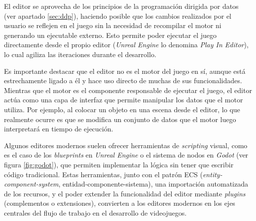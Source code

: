 \medskip

El editor se aprovecha de los principios de la programación dirigida por datos (ver apartado \ref{sec:ddp}), haciendo posible que los cambios realizados por el usuario se reflejen en el juego sin la necesidad de recompilar el motor ni generando un ejecutable externo. Esto permite poder ejecutar el juego directamente desde el propio editor (\textit{Unreal Engine} lo denomina \textit{Play In Editor}), lo cual agiliza las iteraciones durante el desarrollo.

\medskip

Es importante destacar que el editor no es el motor del juego en sí, aunque está estrechamente ligado a él y hace uso directo de muchas de sus funcionalidades. Mientras que el motor es el componente responsable de ejecutar el juego, el editor actúa como una capa de interfaz que permite manipular los datos que el motor utiliza. Por ejemplo, al colocar un objeto en una escena desde el editor, lo que realmente ocurre es que se modifica un conjunto de datos que el motor luego interpretará en tiempo de ejecución.

\medskip

Algunos editores modernos suelen ofrecer herramientas de \textit{scripting} visual, como es el caso de los \textit{blueprints} en \textit{Unreal Engine} o el sistema de nodos en \textit{Godot} (ver figura \ref{fig:godot}), que permiten implementar la lógica sin tener que escribir código tradicional. Estas herramientas, junto con el patrón ECS (\textit{entity-component-system}, entidad-componente-sistema), una importación automatizada de los recursos, y el poder extender la funcionalidad del editor mediante \textit{plugins} (complementos o extensiones), convierten a los editores modernos en los ejes centrales del flujo de trabajo en el desarrollo de videojuegos.

